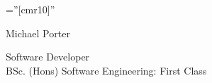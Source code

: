 \documentclass[a4paper,10pt]{article}
\begin{document}
\pagestyle{empty} %

\font\fb=''[cmr10]'' %

\par{\centering
		{\Huge Michael Porter
	}\par}
	
\vspace{5pt}

\par{\centering
		{\large Software Developer\\BSc. (Hons) Software Engineering: First Class
	}\bigskip\par}













\newpage










\vspace*{\fill}

\\
\vspace{5mm}
\end{document}

